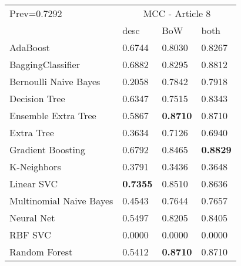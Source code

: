 \begin{tabular}{|l|l|l|l| }
\hline
Prev=0.7292 &  \multicolumn{3}{c|}{MCC - Article 8} \\
\cline{2-4} & desc & BoW & both \\ \hline
AdaBoost                & 0.6744 & 0.8030 & 0.8267\\
BaggingClassifier       & 0.6882 & 0.8295 & 0.8812\\
Bernoulli Naive Bayes   & 0.2058 & 0.7842 & 0.7918\\
Decision Tree           & 0.6347 & 0.7515 & 0.8343\\
Ensemble Extra Tree     & 0.5867 & {\bf 0.8710} & 0.8710\\
Extra Tree              & 0.3634 & 0.7126 & 0.6940\\
Gradient Boosting       & 0.6792 & 0.8465 & {\bf 0.8829}\\
K-Neighbors             & 0.3791 & 0.3436 & 0.3648\\
Linear SVC              & {\bf 0.7355} & 0.8510 & 0.8636\\
Multinomial Naive Bayes & 0.4543 & 0.7644 & 0.7657\\
Neural Net              & 0.5497 & 0.8205 & 0.8405\\
RBF SVC                 & 0.0000 & 0.0000 & 0.0000\\
Random Forest           & 0.5412 & {\bf 0.8710} & 0.8710\\
\hline
\end{tabular}